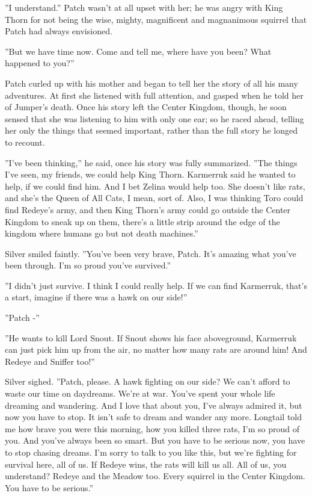 \documentclass[12pt]{book}
\begin{document}
''I understand.'' Patch wasn't at all upset with her; he was angry with King Thorn for not being the wise, mighty, magnificent and magnanimous squirrel that Patch had always envisioned.

''But we have time now. Come and tell me, where have you been? What happened to you?''

Patch curled up with his mother and began to tell her the story of all his many adventures. At first she listened with full attention, and gasped when he told her of Jumper's death. Once his story left the Center Kingdom, though, he soon sensed that she was listening to him with only one ear; so he raced ahead, telling her only the things that seemed important, rather than the full story he longed to recount.

''I've been thinking,'' he said, once his story was fully summarized. ''The things I've seen, my friends, we could help King Thorn. Karmerruk said he wanted to help, if we could find him. And I bet Zelina would help too. She doesn't like rats, and she's the Queen of All Cats, I mean, sort of. Also, I was thinking Toro could find Redeye's army, and then King Thorn's army could go outside the Center Kingdom to sneak up on them, there's a little strip around the edge of the kingdom where humans go but not death machines.''

Silver smiled faintly. ''You've been very brave, Patch. It's amazing what you've been through. I'm so proud you've survived.''

''I didn't just survive. I think I could really help. If we can find Karmerruk, that's a start, imagine if there was a hawk on our side!''

''Patch -''

''He wants to kill Lord Snout. If Snout shows his face aboveground, Karmerruk can just pick him up from the air, no matter how many rats are around him! And Redeye and Sniffer too!''

Silver sighed. ''Patch, please. A hawk fighting on our side? We can't afford to waste our time on daydreams. We're at war. You've spent your whole life dreaming and wandering. And I love that about you, I've always admired it, but now you have to stop. It isn't safe to dream and wander any more. Longtail told me how brave you were this morning, how you killed three rats, I'm so proud of you. And you've always been so smart. But you have to be serious now, you have to stop chasing dreams. I'm sorry to talk to you like this, but we're fighting for survival here, all of us. If Redeye wins, the rats will kill us all. All of us, you understand? Redeye and the Meadow too. Every squirrel in the Center Kingdom. You have to be serious.''
\end{document}
